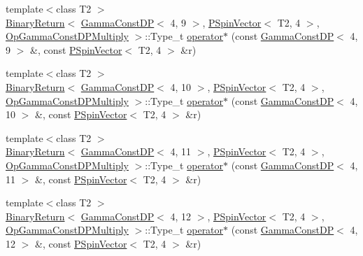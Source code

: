 \begin{DoxyCompactItemize}
\item 
{\footnotesize template$<$class T2 $>$ }\\\mbox{\hyperlink{structENSEM_1_1BinaryReturn}{Binary\+Return}}$<$ \mbox{\hyperlink{classENSEM_1_1GammaConstDP}{Gamma\+Const\+DP}}$<$ 4, 9 $>$, \mbox{\hyperlink{classENSEM_1_1PSpinVector}{P\+Spin\+Vector}}$<$ T2, 4 $>$, \mbox{\hyperlink{structENSEM_1_1OpGammaConstDPMultiply}{Op\+Gamma\+Const\+D\+P\+Multiply}} $>$\+::Type\+\_\+t \mbox{\hyperlink{group__primspinvector_ga39c7d40232a2f254a4b3903a51cb61db}{operator$\ast$}} (const \mbox{\hyperlink{classENSEM_1_1GammaConstDP}{Gamma\+Const\+DP}}$<$ 4, 9 $>$ \&, const \mbox{\hyperlink{classENSEM_1_1PSpinVector}{P\+Spin\+Vector}}$<$ T2, 4 $>$ \&r)
\item 
{\footnotesize template$<$class T2 $>$ }\\\mbox{\hyperlink{structENSEM_1_1BinaryReturn}{Binary\+Return}}$<$ \mbox{\hyperlink{classENSEM_1_1GammaConstDP}{Gamma\+Const\+DP}}$<$ 4, 10 $>$, \mbox{\hyperlink{classENSEM_1_1PSpinVector}{P\+Spin\+Vector}}$<$ T2, 4 $>$, \mbox{\hyperlink{structENSEM_1_1OpGammaConstDPMultiply}{Op\+Gamma\+Const\+D\+P\+Multiply}} $>$\+::Type\+\_\+t \mbox{\hyperlink{group__primspinvector_gaba02d1dbf98d31e3ed096064681c46aa}{operator$\ast$}} (const \mbox{\hyperlink{classENSEM_1_1GammaConstDP}{Gamma\+Const\+DP}}$<$ 4, 10 $>$ \&, const \mbox{\hyperlink{classENSEM_1_1PSpinVector}{P\+Spin\+Vector}}$<$ T2, 4 $>$ \&r)
\item 
{\footnotesize template$<$class T2 $>$ }\\\mbox{\hyperlink{structENSEM_1_1BinaryReturn}{Binary\+Return}}$<$ \mbox{\hyperlink{classENSEM_1_1GammaConstDP}{Gamma\+Const\+DP}}$<$ 4, 11 $>$, \mbox{\hyperlink{classENSEM_1_1PSpinVector}{P\+Spin\+Vector}}$<$ T2, 4 $>$, \mbox{\hyperlink{structENSEM_1_1OpGammaConstDPMultiply}{Op\+Gamma\+Const\+D\+P\+Multiply}} $>$\+::Type\+\_\+t \mbox{\hyperlink{group__primspinvector_gad1bc0eb5b6f881a32c6fda1e7b14d083}{operator$\ast$}} (const \mbox{\hyperlink{classENSEM_1_1GammaConstDP}{Gamma\+Const\+DP}}$<$ 4, 11 $>$ \&, const \mbox{\hyperlink{classENSEM_1_1PSpinVector}{P\+Spin\+Vector}}$<$ T2, 4 $>$ \&r)
\item 
{\footnotesize template$<$class T2 $>$ }\\\mbox{\hyperlink{structENSEM_1_1BinaryReturn}{Binary\+Return}}$<$ \mbox{\hyperlink{classENSEM_1_1GammaConstDP}{Gamma\+Const\+DP}}$<$ 4, 12 $>$, \mbox{\hyperlink{classENSEM_1_1PSpinVector}{P\+Spin\+Vector}}$<$ T2, 4 $>$, \mbox{\hyperlink{structENSEM_1_1OpGammaConstDPMultiply}{Op\+Gamma\+Const\+D\+P\+Multiply}} $>$\+::Type\+\_\+t \mbox{\hyperlink{group__primspinvector_gab182b2b8559b1382be36d58f251cec0e}{operator$\ast$}} (const \mbox{\hyperlink{classENSEM_1_1GammaConstDP}{Gamma\+Const\+DP}}$<$ 4, 12 $>$ \&, const \mbox{\hyperlink{classENSEM_1_1PSpinVector}{P\+Spin\+Vector}}$<$ T2, 4 $>$ \&r)

\end{DoxyCompactItemize}

